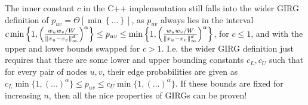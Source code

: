 The inner constant $c$ in the C++ implementation still falls into the wider GIRG definition of $p_{uv} = \Theta \left [ 
    \min \left \{ 
        ...
    \right \}
\right ]$, as $p_{uv}$ always lies in the interval $c \min \left \{ 
        1,
        \left (
            \frac{w_u w_v / W}{\left\lVert x_u - x_v\right\rVert_\infty^d}
        \right )^\alpha    
    \right \} \leq p_{uv} \leq \min \left \{ 
        1,
        \left (
            \frac{w_u w_v / W}{\left\lVert x_u - x_v\right\rVert_\infty^d}
        \right )^\alpha    
    \right \}$, for $c \leq 1$, and with the upper and lower bounds swapped for $c > 1$.
I.e. the wider GIRG definition just requires that there are some lower and upper bounding constants $c_L, c_U$ such that for every pair of nodes $u, v$, their edge probabilities are given as $c_L \min \{ 1, (...)^\alpha \} \leq p_{uv} \leq c_U \min \{ 1, (...)^\alpha \}$. If these bounds are fixed for increasing $n$, then all the nice properties of GIRGs can be proven!













